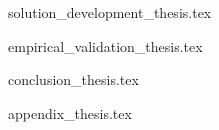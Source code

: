 \documentclass[11pt,a4paper]{report}
\begin{document}
{solution_development_thesis.tex}

{empirical_validation_thesis.tex}

{conclusion_thesis.tex}




\renewcommand{\bibname}{References}


\renewcommand{\bibname}{Systematic Literature Review References}

\appendix
{appendix_thesis.tex}

\end{document}
